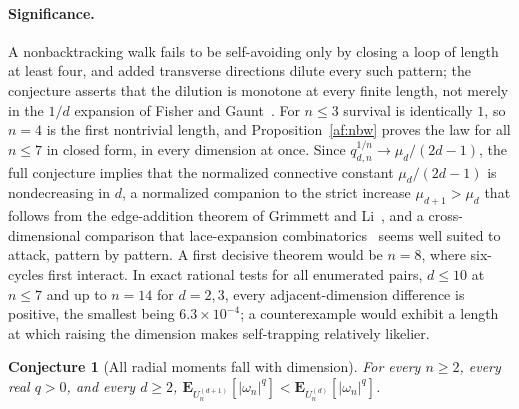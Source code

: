\documentclass[11pt]{article}
\newtheorem{conjecture}{Conjecture}
\theoremstyle{definition}
\begin{document}
\paragraph{Significance.}
A nonbacktracking walk fails to be self-avoiding only by closing a loop of length at least four, and added transverse directions dilute every such pattern; the conjecture asserts that the dilution is monotone at every finite length, not merely in the $1/d$ expansion of Fisher and Gaunt~\cite{FG64}.  For $n\le3$ survival is identically $1$, so $n=4$ is the first nontrivial length, and Proposition~\ref{af:nbw} proves the law for all $n\le7$ in closed form, in every dimension at once.  Since $q_{d,n}^{1/n}\to\mu_d/(2d-1)$, the full conjecture implies that the normalized connective constant $\mu_d/(2d-1)$ is nondecreasing in $d$, a normalized companion to the strict increase $\mu_{d+1}>\mu_d$ that follows from the edge-addition theorem of Grimmett and Li~\cite{GrL14}, and a cross-dimensional comparison that lace-expansion combinatorics~\cite{FvdH13} seems well suited to attack, pattern by pattern.  A first decisive theorem would be $n=8$, where six-cycles first interact.  In exact rational tests for all enumerated pairs, $d\le10$ at $n\le7$ and up to $n=14$ for $d=2,3$, every adjacent-dimension difference is positive, the smallest being $6.3\times10^{-4}$; a counterexample would exhibit a length at which raising the dimension makes self-trapping relatively likelier.

\begin{conjecture}[All radial moments fall with dimension]\label{af15}
For every $n\ge2$, every real $q>0$, and every $d\ge2$, $\mathbf E_{U_n^{(d+1)}}[|\omega_n|^q]<\mathbf E_{U_n^{(d)}}[|\omega_n|^q]$.
\end{conjecture}
\end{document}
